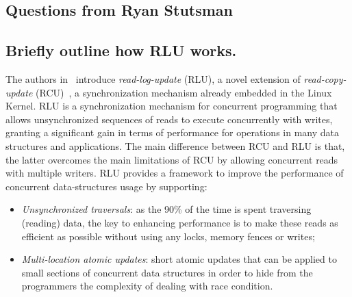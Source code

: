 


\begin{refsection}
\section{Questions from Ryan Stutsman}
\label{sec:member4}

\subsection*{Briefly outline how RLU works.}
\label{sec:member41}

The authors in~\cite{Matveev:2015:RLS:2815400.2815406} introduce
\emph{read-log-update} (RLU), a novel extension of \emph{read-copy-update}
(RCU)~\cite{McKenney}, a synchronization mechanism already embedded in the
Linux Kernel.
%
RLU is a synchronization mechanism for concurrent programming that allows
unsynchronized sequences of reads to execute concurrently with writes,
granting a significant gain in terms of performance for operations in many
data structures and applications.
%
The main difference between RCU and RLU is that, the latter overcomes the main
limitations of RCU by allowing concurrent reads with multiple writers.
%
RLU provides a framework to improve the performance of concurrent
data-structures usage by supporting:
\begin{itemize}
\item \emph{Unsynchronized traversals}: as the 90\% of the time is spent
  traversing (reading) data, the key to enhancing performance is to make these
  reads as efficient as possible without using any locks, memory fences or
  writes;
\item \emph{Multi-location atomic updates}: short atomic updates that can be
  applied to small sections of concurrent data structures in order to hide
  from the programmers the complexity of dealing with race condition.
\end{itemize}


\end{refsection}
